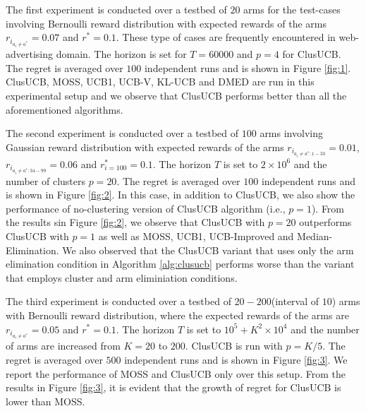 The first experiment is conducted over a testbed of $20$ arms for the test-cases involving Bernoulli reward distribution with expected rewards of the arms $r_{i_{a_{i}\neq a^{*}}}=0.07$ and $r^{*}=0.1$. These type of cases are frequently encountered in web-advertising domain. The horizon is set for $T=60000$ and $p=4$ for ClusUCB. The regret is averaged over $100$ independent runs and is shown in Figure \ref{fig:1}. 
ClusUCB, MOSS, UCB1, UCB-V, KL-UCB and DMED are run in this experimental setup and we observe that ClusUCB performs better than all the aforementioned algorithms.

The second experiment is conducted over a testbed of $100$ arms involving Gaussian reward distribution with expected rewards of the arms $r_{i_{a_{i}\neq a^{*}:1-33}}=0.01$, $r_{i_{a_{i}\neq a^{*}:34-99}}=0.06$ and $r^{*}_{i=100}=0.1$. The horizon $T$ is set to $2\times 10^{6}$ and the number of clusters $p=20$. The regret is averaged over $100$ independent runs and is shown in Figure \ref{fig:2}. In this case, in addition to ClusUCB, we also show the performance of no-clustering version of ClusUCB algorithm (i.e., $p=1$).   From the results sin Figure \ref{fig:2}, we observe that ClusUCB with $p=20$ outperforms ClusUCB with $p=1$ as well as MOSS, UCB1, UCB-Improved and Median-Elimination. We also observed that the ClusUCB variant that uses only  the arm elimination condition in Algorithm \ref{alg:clusucb} performs worse than the variant that employs cluster and arm eliminiation conditions.

The third experiment is conducted over a testbed of $20-200$(interval of $10$) arms with Bernoulli reward distribution, where the expected rewards of the arms are $r_{i_{a_{i}\neq a^{*}}}=0.05$ and $r^{*}=0.1$. The horizon $T$ is set to $10^{5} + K^{2}\times 10^{4}$ and the number of arms are increased from $K=20$ to $200$. ClusUCB is run with $p=K/5$. The regret is averaged over $500$ independent runs and is shown in Figure \ref{fig:3}. We report the performance of MOSS and ClusUCB only over this setup. From the results in Figure \ref{fig:3}, it is evident that the growth of regret for ClusUCB is lower than MOSS. 

